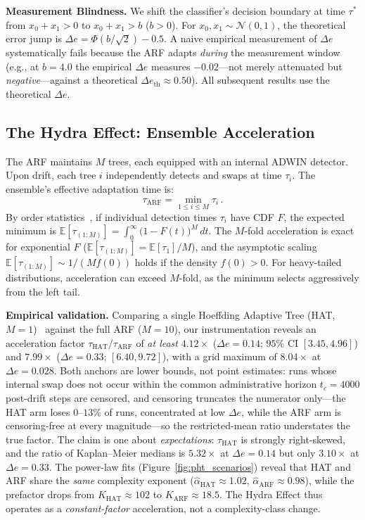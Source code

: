 \documentclass[10pt,conference]{IEEEtran}
\theoremstyle{definition}
\begin{document}
\noindent\textbf{Measurement Blindness.}
We shift the classifier's decision boundary at time $\tau^*$ from $x_0 + x_1 > 0$ to $x_0 + x_1 > b$ ($b > 0$).
For $x_0, x_1 \sim \mathcal{N}(0,1)$, the theoretical error jump is $\Delta e = \Phi(b/\sqrt{2}) - 0.5$. A naive empirical measurement of $\Delta e$ systematically fails because the ARF adapts \emph{during} the measurement window (e.g., at $b = 4.0$ the empirical $\Delta e$ measures $-0.02$---not merely attenuated but \emph{negative}---against a theoretical $\Delta e_{\mathrm{th}} \approx 0.50$). All subsequent results use the theoretical $\Delta e$.

\subsection{The Hydra Effect: Ensemble Acceleration}\label{sec:hydra}

The ARF maintains $M$ trees, each equipped with an internal ADWIN detector.
Upon drift, each tree $i$ independently detects and swaps at time $\tau_i$.
The ensemble's effective adaptation time is:
\begin{equation}\label{eq:hydra}
  \tau_{\mathrm{ARF}} = \min_{1 \le i \le M} \tau_i\,.
\end{equation}
By order statistics~\cite{david_order_2003}, if individual detection times $\tau_i$ have CDF $F$, the expected minimum is $\mathbb{E}[\tau_{(1:M)}] = \int_0^{\infty} \bigl(1 - F(t)\bigr)^M \, dt$.
The $M$-fold acceleration is exact for exponential $F$ ($\mathbb{E}[\tau_{(1:M)}] = \mathbb{E}[\tau_1]/M$), and the asymptotic scaling $\mathbb{E}[\tau_{(1:M)}] \sim 1/(M f(0))$ holds if the density $f(0)>0$. For heavy-tailed distributions, acceleration can exceed $M$-fold, as the minimum selects aggressively from the left tail.

\textbf{Empirical validation.}
Comparing a single Hoeffding Adaptive Tree (HAT, $M = 1$)~\cite{bifet_hat_2009} against the full ARF ($M = 10$), our instrumentation reveals an acceleration factor $\tau_{\mathrm{HAT}} / \tau_{\mathrm{ARF}}$ of \emph{at least} $4.12\times$ ($\Delta e = 0.14$; $95\%$ CI $[3.45, 4.96]$) and $7.99\times$ ($\Delta e = 0.33$; $[6.40, 9.72]$), with a grid maximum of $8.04\times$ at $\Delta e = 0.028$. Both anchors are lower bounds, not point estimates: runs whose internal swap does not occur within the common administrative horizon $t_c = 4000$ post-drift steps are censored, and censoring truncates the numerator only---the HAT arm loses $0$--$13\%$ of runs, concentrated at low $\Delta e$, while the ARF arm is censoring-free at every magnitude---so the restricted-mean ratio understates the true factor. The claim is one about \emph{expectations}: $\tau_{\mathrm{HAT}}$ is strongly right-skewed, and the ratio of Kaplan--Meier medians is $5.32\times$ at $\Delta e = 0.14$ but only $3.10\times$ at $\Delta e = 0.33$. The power-law fits (Figure~\ref{fig:pht_scenarios}) reveal that HAT and ARF share the \emph{same} complexity exponent ($\hat\alpha_{\mathrm{HAT}} \approx 1.02$, $\hat\alpha_{\mathrm{ARF}} \approx 0.98$), while the prefactor drops from $K_{\mathrm{HAT}} \approx 102$ to $K_{\mathrm{ARF}} \approx 18.5$. The Hydra Effect thus operates as a \emph{constant-factor} acceleration, not a complexity-class change.
\end{document}
